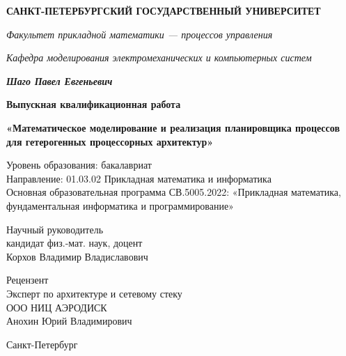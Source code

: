 \documentclass[14pt, oneside]{extbook}
\begin{document}
\thispagestyle{empty}
\begin{center}
        \textbf{САНКТ-ПЕТЕРБУРГСКИЙ ГОСУДАРСТВЕННЫЙ УНИВЕРСИТЕТ}

        \vspace{1em}
        \textit{Факультет прикладной математики --- процессов управления}

        \vspace{1em}
        \textit{Кафедра моделирования электромеханических и компьютерных систем}

        \vspace{4em}
        \textbf{\textit{\large Шаго Павел Евгеньевич}}

        \vspace{2em}
        \textbf{\Large Выпускная квалификационная работа}

        \vspace{1em}
        \textbf{\Large «Математическое моделирование и реализация планировщика
        процессов для гетерогенных процессорных архитектур»}

        \vspace{2em}
        Уровень образования: бакалавриат \\
        Направление: 01.03.02 Прикладная математика и информатика \\
        Основная образовательная программа СВ.5005.2022:
        «Прикладная математика, фундаментальная информатика и программирование»

        \vspace{2em}
        \begin{flushright}
                Научный руководитель \\
                кандидат физ.-мат. наук, доцент \\
                Корхов Владимир Владиславович
        \end{flushright}

        \begin{flushright}
                Рецензент \\
                Эксперт по архитектуре и сетевому стеку \\
                ООО НИЦ АЭРОДИСК \\
                Анохин Юрий Владимирович
        \end{flushright}

        \vfill
        Санкт-Петербург\\ \the\year
\end{center}
\end{document}
